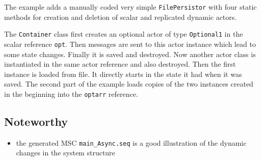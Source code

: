 The example adds a manually coded very simple \texttt{FilePersistor} with four static methods for creation and deletion of scalar and replicated
dynamic actors.

The \texttt{Container} class first creates an optional actor of type \texttt{Optional1} in the scalar reference \texttt{opt}.
Then messages are sent to this actor instance which lead to some state changes. Finally it is saved and destroyed.
Now another actor class is instantiated in the same actor reference and also destroyed. Then the first instance is loaded from file.
It directly starts in the state it had when it was saved. The second part of the example loads copies of the two
instances created in the beginning into the \texttt{optarr} reference.

\subsection{Noteworthy}

\begin{itemize}
\item the generated MSC \texttt{main\_Async.seq} is a good illustration of the dynamic changes in the system structure
\end{itemize}
